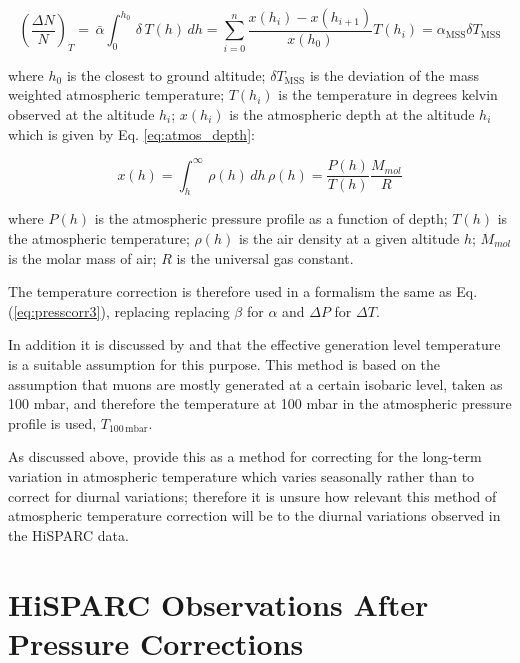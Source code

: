 \begin{equation}
\left( \frac{\Delta N}{N} \right)_T = \, \bar{\alpha}  \int^{h_0}_{0}  \, \delta \, T(h) \, dh = \sum_{i=0}^{n} \frac{x(h_i) - x(h_{i+1})}{x(h_0)} T(h_i)  = \alpha_{\mathrm{MSS}} \delta T_{\mathrm{MSS}}
\label{eq:tempcorr}
\end{equation}

where $h_0$ is the closest to ground altitude; $\delta T_{\mathrm{MSS}}$ is the deviation of the mass weighted atmospheric temperature; $T(h_i)$ is the temperature in degrees kelvin observed at the altitude $h_i$; $x(h_ i)$ is the atmospheric depth at the altitude $h_i$ which is given by Eq. \ref{eq:atmos_depth}:

\begin{equation}
x(h) = \int^{\infty}_{h}  \, \rho (h) \, dh  \, \rho (h) = \frac{P(h)}{T(h)} \frac{M_{mol}}{R} 
\label{eq:atmos_depth}
\end{equation}

where $P(h)$ is the atmospheric pressure profile as a function of depth; $T(h)$ is the atmospheric temperature; $\rho(h)$ is the air density at a given altitude $h$; $M_{mol}$ is the molar mass of air; $R$ is the universal gas constant.

The temperature correction is therefore used in a formalism the same as Eq. (\ref{eq:presscorr3}), replacing replacing $\beta$ for $\alpha$ and $\Delta P$ for $\Delta T$.

In addition it is discussed by \cite{berkova_temperature_2011} and \cite{mendoncca_temperature_2016} that the effective generation level temperature is a suitable assumption for this purpose. This method is based on the assumption that muons are mostly generated at a certain isobaric level, taken as 100 mbar, and therefore the temperature at 100 mbar in the atmospheric pressure profile is used, $T_{\mathrm{100 \, mbar}}$.

As discussed above, \cite{mendoncca_temperature_2016} provide this as a method for correcting for the long-term variation in atmospheric temperature which varies seasonally rather than to correct for diurnal variations; therefore it is unsure how relevant this method of atmospheric temperature correction will be to the diurnal variations observed in the HiSPARC data.



 

\section{HiSPARC Observations After Pressure Corrections}\label{sec:HS_obs_Pcorr}


